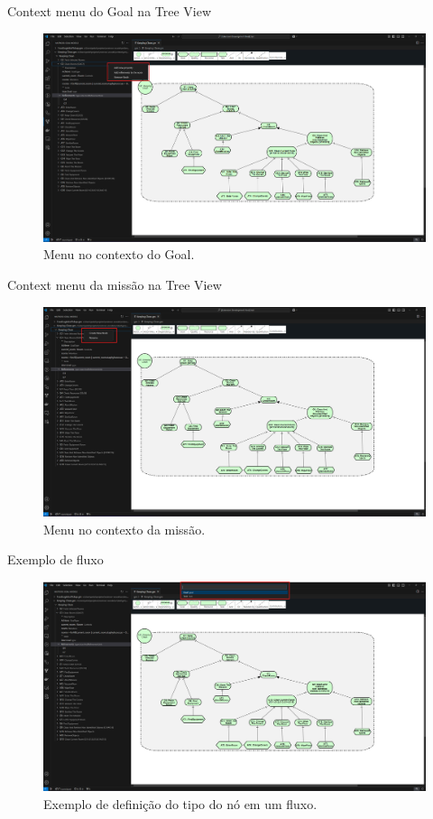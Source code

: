 \documentclass{beamer}
\begin{document}
\begin{frame}{Context menu do Goal na Tree View}
  \begin{figure}[!h]
    \centering
    \includegraphics[width=1\textwidth]{submenu_on_right_click.png} 
    \caption{Menu no contexto do Goal.}
  \end{figure}
\end{frame}
\begin{frame}{Context menu da missão na Tree View}
  \begin{figure}[!h]
    \centering
    \includegraphics[width=1\textwidth]{rightclickonmission.png} 
    \caption{Menu no contexto da missão.}
  \end{figure}
\end{frame}
\begin{frame}{Exemplo de fluxo}
  \begin{figure}[!h]
    \centering
    \includegraphics[width=1\textwidth]{flow1.png} 
    \caption{Exemplo de definição do tipo do nó em um fluxo.}
  \end{figure}
\end{frame}
\end{document}

